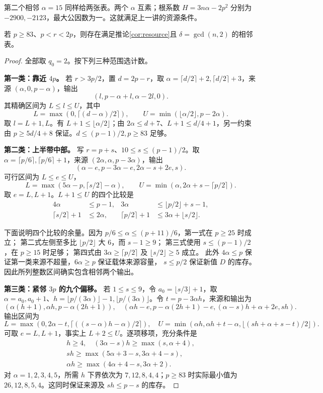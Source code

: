 第二个相邻 $\alpha=15$ 同样给两张表。两个 $\alpha$ 互素；根系数 $H=3n\alpha-2p^2$ 分别为 $-2900,-2123$，最大公因数为一。这就满足上一讲的资源条件。
\begin{lemma}[大素数的三组计数公式]\label{lem:upper-supply}
若 $p\ge83$、$p<r<2p$，则存在满足推论\ref{cor:resource}且 $\delta=\gcd(n,2)$ 的相邻表。
\end{lemma}
\begin{proof}
全部取 $q_0=2$。按下列三种范围选计数。

\par\noindent\textbf{第一类：靠近 $4p$。} 若 $r>3p/2$，置 $d=2p-r$，取 $\alpha=\lceil d/2\rceil+2,\lceil d/2\rceil+3$，来源 $(\alpha,0,p-\alpha)$，输出
\[(l,p-\alpha+l,\alpha-2l,0).
\]
其精确区间为 $L\le l\le U$，其中
\[L=\max(0,\lceil(d-\alpha)/2\rceil),\qquad
U=\min(\lfloor\alpha/2\rfloor,p-2\alpha).
\]
取 $l=L+1,L$。有 $L+1\le\lfloor\alpha/2\rfloor$；由 $2\alpha\le d+7$、$L+1\le d/4+1$，另一约束由 $p\ge5d/4+8$ 保证。$d\le(p-1)/2,p\ge83$ 足够。

\par\noindent\textbf{第二类：上半带中部。} 写 $r=p+s$、$10\le s\le(p-1)/2$。取 $\alpha=\lceil p/6\rceil,\lceil p/6\rceil+1$，来源 $(2\alpha,\alpha,p-3\alpha)$，输出
\[(\alpha-e,p-3\alpha-e,2\alpha-s+2e,s).
\]
可行区间为 $L\le e\le U$，
\[L=\max(5\alpha-p,\lceil s/2\rceil-\alpha),\qquad
U=\min(\alpha,2\alpha+s-\lceil p/2\rceil).
\]
取 $e=L,L+1$。$L+1\le U$ 的四个比较是
\begin{align*}
4\alpha&\le p-1,&3\alpha&\le\lfloor p/2\rfloor+s-1,\\
\lceil s/2\rceil+1&\le2\alpha,&\lceil p/2\rceil+1&\le3\alpha+\lfloor s/2\rfloor.
\end{align*}

下面说明四个比较的余量。因为 $p/6\le\alpha\le(p+11)/6$，第一式在 $p\ge25$ 时成立；
第二式左侧至多比 $\lfloor p/2\rfloor$ 大 $6$，而 $s-1\ge9$；
第三式使用 $s\le(p-1)/2$，在 $p\ge15$ 时足够；
第四式由 $3\alpha\ge\lceil p/2\rceil$ 及 $\lfloor s/2\rfloor\ge5$ 成立。
此外 $4\alpha\le p$ 保证第一类来源不超量，$6\alpha\ge p$ 保证载体来源容量，
$s\le p/2$ 保证新值 $D$ 的库存。因此所列整数区间确实包含相邻两个输出。

\par\noindent\textbf{第三类：紧邻 $3p$ 的九个偏移。} 若 $1\le s\le9$，令 $a_0=\lfloor s/3\rfloor+1$，取 $\alpha=a_0,a_0+1$、$h=\lfloor p/(3\alpha)\rfloor-1,\lfloor p/(3\alpha)\rfloor$。令 $t=p-3\alpha h$，来源和输出为
\[
(\alpha(h+1),\alpha h,p-\alpha(2h+1)),\quad
(\alpha h-e,p-\alpha(2h+1)-e,(\alpha-s)h+\alpha+2e,sh).
\]
输出区间为
\[
L=\max(0,2\alpha-t,\lceil((s-\alpha)h-\alpha)/2\rceil),\quad
U=\min(\alpha h,\alpha h+t-\alpha,\lfloor(sh+\alpha+s-t)/2\rfloor).
\]
可取 $e=L,L+1$，事实上 $L+2\le U$。逐项移项，充分条件是
\[
\begin{gathered}
h\ge4,\quad(3\alpha-s)h\ge\max(s,\alpha+4),\\
sh\ge\max(5\alpha+3-s,3\alpha+4-s),\\
\alpha h\ge\max(4\alpha+4-s,3\alpha+2).
\end{gathered}
\]
对 $\alpha=1,2,3,4,5$，所需 $h$ 下界依次为 $7,12,8,4,4$；$p\ge83$ 时实际最小值为 $26,12,8,5,4$。这同时保证来源及 $sh\le p-s$ 的库存。



\end{proof}
